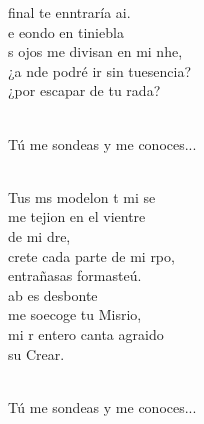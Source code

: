 \documentclass[12pt]{article}
\begin{document}
\begin{multicols*}{2}
\begin{cancion}
	final te enntraría ai. \\
	e eondo en tiniebla \\
	s ojos me divisan en mi nhe, \\
	¿a nde podré ir sin tuesencia?  \\
	¿por escapar de tu rada?  \\\jump\\
	\begin{chorus}%
Tú me sondeas y me conoces... \\
	\end{chorus}%
	\jump\\
	Tus ms modelon t mi se\\
	me tejion en el vientre\\
	de mi dre, \\
	crete cada parte de mi rpo, \\
	 entrañasas formasteú. \\
	ab es desbonte \\
	me soecoge tu Misrio, \\
	mi r entero canta agraido \\
	 su Crear. \\\jump\\
	\begin{chorus}%
Tú me sondeas y me conoces... \\
	\end{chorus}%
	\jump\\
\end{cancion}%


\end{multicols*}
\end{document}
